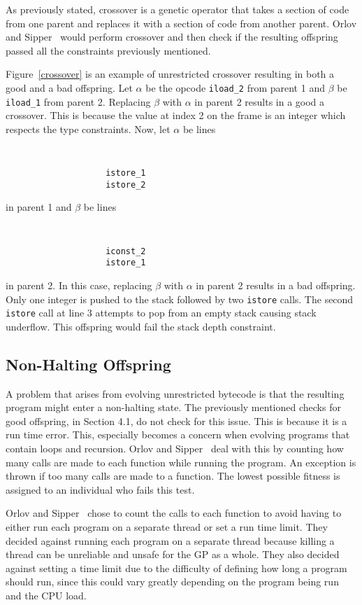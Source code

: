 \documentclass{sig-alternate}
\begin{document}
As previously stated, crossover is a genetic operator that takes a section of code from one parent and replaces it with a section of code from another parent. Orlov and Sipper~\cite{FINCH:2011} would perform crossover and then check if the resulting offspring passed all the constraints previously mentioned.\par 

Figure~\ref{crossover} is an example of unrestricted crossover resulting in both a good and a bad offspring. Let $\alpha$ be the opcode \texttt{iload\_2} from parent 1 and $\beta$ be \texttt{iload\_1} from parent 2. Replacing $\beta$ with $\alpha$ in parent 2 results in a good a crossover. This is because the value at index 2 on the frame is an integer which respects the type constraints. Now, let $\alpha$ be lines
{\tt
\begin{verbatim}
                    istore_1
                    istore_2
\end{verbatim}}

\noindent in parent 1 and $\beta$ be lines
{\tt
\begin{verbatim}
                    iconst_2
                    istore_1
\end{verbatim}}
\noindent 
in parent 2. In this case, replacing $\beta$ with $\alpha$ in parent 2 results in a bad offspring. Only one integer is pushed to the stack followed by two \texttt{istore} calls. The second \texttt{istore} call at line 3 attempts to pop from an empty stack causing stack underflow. This offspring would fail the stack depth constraint.

\subsection{Non-Halting Offspring}
A problem that arises from evolving unrestricted bytecode is that the resulting program might enter a non-halting state. The previously mentioned checks for good offspring, in Section 4.1, do not check for this issue. This is because it is a run time error. This, especially becomes a concern when evolving programs that contain loops and recursion.
Orlov and Sipper~\cite{FINCH:2011} deal with this by counting how many calls are made to each function while running the program. An exception is thrown if too many calls are made to a function. The lowest possible fitness is assigned to an individual who fails this test.\par

Orlov and Sipper~\cite{FINCH:2011} chose to count the calls to each function to avoid having to either run each program on a separate thread or set a run time limit. They decided against running each program on a separate thread because killing a thread can be unreliable and unsafe for the GP as a whole. They also decided against setting a time limit due to the difficulty of defining how long a program should run, since this could vary greatly depending on the program being run and the CPU load.
\end{document}
